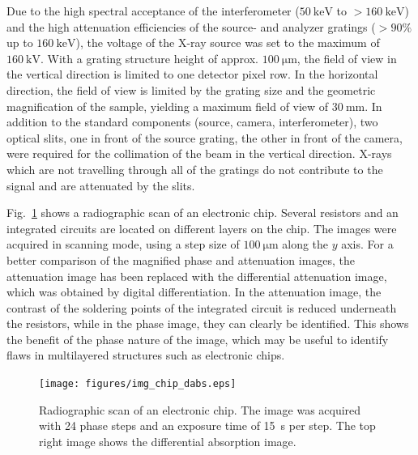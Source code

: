 \documentclass[aps,prl,preprint]{revtex4-1}
\begin{document}
Due to the high spectral acceptance \cite{Weitkamp2005,Thuering2013c} of the
interferometer ($\SI{50}{\kilo\electronvolt}$ to
$>\SI{160}{\kilo\electronvolt}$) and the high attenuation efficiencies of
the source- and analyzer gratings ($>90\%$ up to
$\SI{160}{\kilo\electronvolt}$), the voltage of the X-ray source was set to
the maximum of $\SI{160}{\kilo\volt}$. With a grating structure height of
approx. $\SI{100}{\micro \metre}$, the field of view in the vertical
direction is limited to one detector pixel row. In the horizontal direction,
the field of view is limited by the grating size and the geometric
magnification of the sample, yielding a maximum field of view of
$\SI{30}{\milli\metre}$. In addition to the standard components (source,
camera, interferometer), two optical slits, one in front of the source
grating, the other in front of the camera, were required for the collimation
of the beam in the vertical direction. X-rays which are not travelling
through all of the gratings do not contribute to the signal and are
attenuated by the slits.


Fig.~\ref{Fig:img_chip} shows a radiographic scan of an electronic chip.
Several resistors and an integrated circuits are located on different layers
on the chip. The images were acquired in scanning mode, using a step size of
$\SI{100}{\micro \metre}$ along the $y$ axis. For a better comparison of the
magnified phase and attenuation images, the attenuation image has been
replaced with the differential attenuation image, which was obtained by
digital differentiation. In the attenuation image, the contrast of the soldering points of
the integrated circuit is reduced underneath the resistors, while in
the phase image, they can clearly be identified. This shows the
benefit of the phase nature of the image, which may be
useful to identify flaws in multilayered structures such as electronic
chips.
\begin{figure}[ht]
    \texttt{[image: figures/img\_chip\_dabs.eps]}
    \caption{Radiographic scan of an electronic chip. The image was acquired
        with 24 phase steps and an exposure time of \SI{15}{\second} per
    step. The top right image shows the differential absorption image.}
    \label{Fig:img_chip}
\end{figure}
\end{document}

